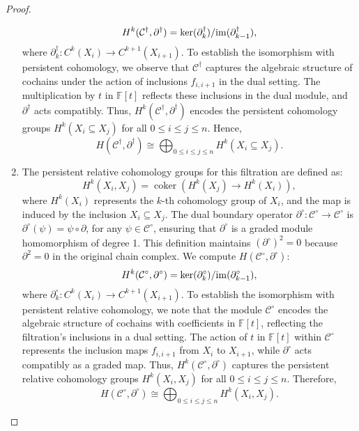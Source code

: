 \begin{proof}
\begin{enumerate}
\[
H^k(\mathcal{C}^\dagger, \partial^\dagger) = \ker(\partial^\dagger_k) / \mathrm{im}(\partial^\dagger_{k-1}),
\]
where \( \partial^\dagger_k: C^k(X_i) \to C^{k+1}(X_{i+1}) \). To establish the isomorphism with persistent cohomology, we observe that \( \mathcal{C}^\dagger \) captures the algebraic structure of cochains under the action of inclusions \( f_{i,i+1} \) in the dual setting. The multiplication by \( t \) in \( \mathbb{F}[t] \) reflects these inclusions in the dual module, and \( \partial^\dagger \) acts compatibly. Thus, \( H^k(\mathcal{C}^\dagger, \partial^\dagger) \) encodes the persistent cohomology groups \( H^k(X_i \subseteq X_j) \) for all \( 0 \leq i \leq j \leq n \). Hence,
\[
H(\mathcal{C}^\dagger, \partial^\dagger) \cong \bigoplus_{0 \leq i \leq j \leq n} H^k(X_i \subseteq X_j).
\]
\item The persistent relative cohomology groups for this filtration are defined as:
\[
H^k(X_i, X_j) = \operatorname{coker} \left( H^k(X_j) \to H^k(X_i) \right),
\]
where \( H^k(X_i) \) represents the \( k \)-th cohomology group of \( X_i \), and the map is induced by the inclusion \( X_i \subseteq X_j \). The dual boundary operator \( \partial^\circ: \mathcal{C}^\circ \to \mathcal{C}^\circ \) is $\partial^\circ(\psi) = \psi \circ \partial$, for any \( \psi \in \mathcal{C}^\circ \), ensuring that \( \partial^\circ \) is a graded module homomorphism of degree 1. This definition maintains \( (\partial^\circ)^2 = 0 \) because \( \partial^2 = 0 \) in the original chain complex. We compute \( H(\mathcal{C}^\circ, \partial^\circ) \):
\[
H^k(\mathcal{C}^\circ, \partial^\circ) = \ker(\partial^\circ_k) / \mathrm{im}(\partial^\circ_{k-1}),
\]
where \( \partial^\circ_k: C^k(X_i) \to C^{k+1}(X_{i+1}) \). To establish the isomorphism with persistent relative cohomology, we note that the module \( \mathcal{C}^\circ \) encodes the algebraic structure of cochains with coefficients in \( \mathbb{F}[t] \), reflecting the filtration's inclusions in a dual setting. The action of \( t \) in \( \mathbb{F}[t] \) within \( \mathcal{C}^\circ \) represents the inclusion maps \( f_{i,i+1} \) from \( X_i \) to \( X_{i+1} \), while \( \partial^\circ \) acts compatibly as a graded map. Thus, \( H^k(\mathcal{C}^\circ, \partial^\circ) \) captures the persistent relative cohomology groups \( H^k(X_i, X_j) \) for all \( 0 \leq i \leq j \leq n \). Therefore,
\[
H(\mathcal{C}^\circ, \partial^\circ) \cong \bigoplus_{0 \leq i \leq j \leq n} H^k(X_i, X_j).
\]
\end{enumerate}
\end{proof}
